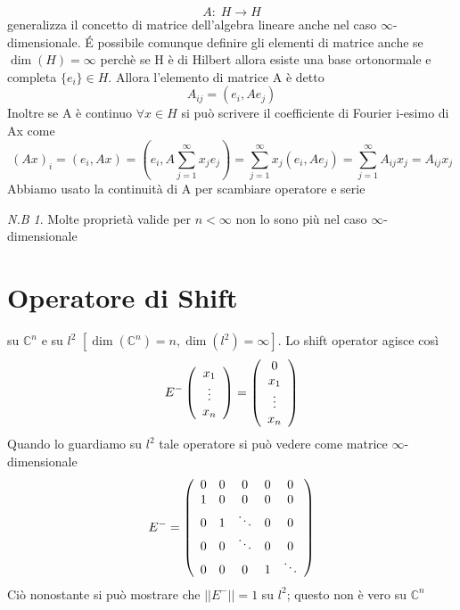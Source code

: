\documentclass[a4paper,11pt]{report}
\theoremstyle{remark}
\newtheorem*{nb}{N.B}
\theoremstyle{definition}
\newcommand{\C}{\mathbb{C}}
\begin{document}
\begin{equation*}
	A: \; H \to H
\end{equation*}
generalizza il concetto di matrice dell'algebra lineare anche nel caso $\infty$-dimensionale. \'E possibile comunque definire gli elementi di matrice anche se $\dim{(H)}=\infty$ perchè se H è di Hilbert allora esiste una base ortonormale e completa $\{e_i\}\in H$. Allora l'elemento di matrice A è detto
\begin{equation*}
	A_{ij} = (e_i,Ae_j)
\end{equation*}
Inoltre se A è continuo $\forall x \in H$ si può scrivere il coefficiente di Fourier i-esimo di Ax come 
\begin{equation*}
	{(Ax)}_i = (e_i, Ax) = (e_i, A\sum_{j=1}^\infty x_je_j) = \sum_{j=1}^\infty x_j (e_i,Ae_j) = \sum_{j=1}^\infty A_{ij}x_j = A_{ij}x_j
\end{equation*}
Abbiamo usato la continuità di A per scambiare operatore e serie 
\begin{nb}
	Molte proprietà valide per $n<\infty$ non lo sono più nel caso $\infty$-dimensionale
\end{nb}

\section*{Operatore di Shift}
su $\C^n$ e su $l^2$ $[\dim{(\C^n)} = n, \dim{(l^2)} = \infty]$. Lo shift operator agisce così
\begin{equation*}
	E^- 
	\left(\begin{array}[]{ccc}
		x_1 \\
		\vdots \\
		x_n		
	\end{array}\right) =
	\left(
		\begin{array}[]{ccc}
			0 \\
			x_1 \\
			\vdots \\
			x_n
		\end{array}
	\right)
\end{equation*}
Quando lo guardiamo su $l^2$ tale operatore si può vedere come matrice $\infty$-dimensionale
\begin{equation*}
	E^- = \left(\begin{array}[]{ccccc}
		0 & 0 &   0    & 0 &    0   \\
		1 & 0 &   0    & 0 &    0   \\
		0 & 1 & \ddots & 0 &    0   \\
		0 & 0 & \ddots & 0 &    0   \\
		0 & 0 &   0    & 1 & \ddots \\
	\end{array}\right)
\end{equation*}
Ciò nonostante si può mostrare che $||E^-|| = 1$ su $l^2$; questo non è vero su $\C^n$
\end{document}
